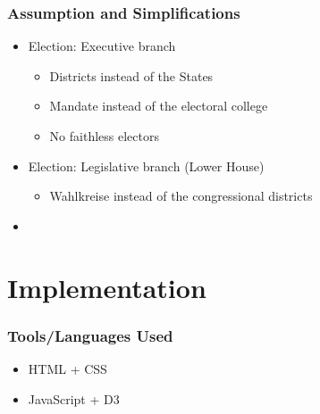 \documentclass{beamer}
\begin{document}
\begin{frame}
\frametitle{Assumption and Simplifications}
\begin{itemize}
\item Election: Executive branch
    \begin{itemize}
    \item Districts instead of the States
    \item Mandate instead of the electoral college
    \item No faithless electors
    \end{itemize}
\item Election: Legislative branch (Lower House)
\begin{itemize}
    \item Wahlkreise instead of the congressional districts
    \end{itemize}
\item {}
\end{itemize}
\end{frame}

\section{Implementation} 
\begin{frame}
\frametitle{Tools/Languages Used}
\begin{itemize}
\item HTML + CSS %
\item JavaScript + D3 
\end{itemize}
\end{frame}
\end{document}
